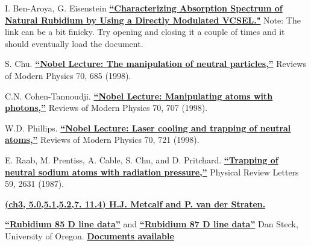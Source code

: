 \documentclass{../lab}
\begin{document}
\begin{thebibliography}{}
\label{sec:References}

     I. Ben-Aroya, G. Eisenstein
    \href{https://www.semanticscholar.org/paper/Characterizing-absorption-spectrum-of-natural-by-a-Ben-Aroya-Eisenstein/9ac9ba7b4a5d430485f7397cdd2f71398016543c/figure/0}{\textbf{``Characterizing Absorption Spectrum of Natural Rubidium by Using a Directly Modulated VCSEL."}} Note: The link can be a bit finicky. Try opening and closing it a couple of times and it should eventually load the document.


     S. Chu. \href{https://www.nobelprize.org/uploads/2018/06/chu-lecture.pdf}{\textbf{``Nobel Lecture: The manipulation of neutral particles,''}} Reviews of Modern Physics 70, 685 (1998). 
  
     C.N. Cohen-Tannoudji. \href{https://www.nobelprize.org/uploads/2018/06/cohen-tannoudji-lecture.pdf}{\textbf{``Nobel Lecture: Manipulating atoms with photons,''}} Reviews of Modern Physics 70, 707 (1998).

     W.D. Phillips. \href{https://www.nobelprize.org/uploads/2018/06/phillips-lecture.pdf}{\textbf{``Nobel Lecture: Laser cooling and trapping of neutral atoms,''}} Reviews of Modern Physics 70, 721 (1998).

     E. Raab, M. Prentiss, A. Cable, S. Chu, and D. Pritchard. \href{https://journals.aps.org/prl/pdf/10.1103/PhysRevLett.59.2631}{\textbf{``Trapping of neutral sodium atoms with radiation pressure,''}} Physical Review Letters 59, 2631 (1987).

     \href{http://books.google.com/books?id=hDJPnSFh-g0C&dq=H.J.+Metcalf+and+P.+van+der+Straeten.+Laser+Cooling+and+Trapping+book&printsec=frontcover&source=bn&hl=en&ei=jMWaS4eRD4TuswPgytidAg&sa=X&oi=book\_result&ct=result&resnum=4&ved=0CBAQ6AEwAw#v=onepage&q=&f=false}{\textbf{(ch3, 5.0,5.1,5.2,7. 11.4) H.J. Metcalf and P. van der Straten. }}

      \href{https://steck.us/alkalidata/rubidium85numbers.pdf}{\textbf{``Rubidium 85 D line data''}} and \href{https://steck.us/alkalidata/rubidium87numbers.1.6.pdf}{\textbf{``Rubidium 87 D line data''}} Dan Steck, University of Oregon. \href{http://steck.us/alkalidata/}{\textbf{Documents available}}


\end{thebibliography}
\end{document}

